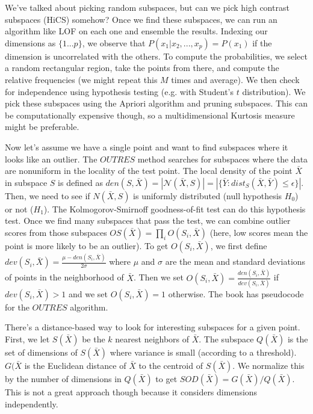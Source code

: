 \documentclass[a4paper]{article}
\begin{document}
We've talked about picking random subspaces, but can we pick high contrast
subspaces (HiCS) somehow? Once we find these subspaces, we can run an algorithm
like LOF on each one and ensemble the results. Indexing our dimensions as
$\{1...p\}$, we observe that $P(x_1 | x_2, ..., x_p) = P(x_1)$ if the dimension
is uncorrelated with the others. To compute the probabilities, we select a
random rectangular region, take the points from there, and compute the
relative frequencies (we might repeat this $M$ times and average). We then check
for independence using hypothesis testing (e.g. with Student's $t$
distribution). We pick these subspaces using the Apriori algorithm and pruning
subspaces. This can be computationally expensive though, so a multidimensional
Kurtosis measure might be preferable.

Now let's assume we have a single point and want to find subspaces where it
looks like an outlier. The $OUTRES$ method searches for subspaces where the
data are nonuniform in the locality of the test point. The local density of the
point $\bar{X}$ in subspace $S$ is defined as $den(S, \bar{X}) = |\mathcal{N}(
\bar{X}, S)| = |\{\bar{Y} : dist_S(\bar{X}, \bar{Y}) \leq \epsilon\}|$. Then,
we need to see if $N(\bar{X}, S)$ is uniformly distributed (null hypothesis
$H_0$) or not ($H_1$). The Kolmogorov-Smirnoff goodness-of-fit test can do
this hypothesis test. Once we find many subspaces that pass the test, we can
combine outlier scores from those subspaces $OS(\bar{X}) = \prod_{i}{O(S_i,
\bar{X})}$ (here, low scores mean the point is more likely to be an outlier).
To get $O(S_i, \bar{X})$, we first define $dev(S_i, \bar{X}) = \frac{\mu -
den(S_i, \bar{X})}{2 \sigma}$ where $\mu$ and $\sigma$ are the mean and standard
deviations of points in the neighborhood of $\bar{X}$. Then we set
$O(S_i, \bar{X}) = \frac{den(S_i, \bar{X})}{dev(S_i, \bar{X})}$ if $dev(S_i,
\bar{X}) > 1$ and we set $O(S_i, \bar{X}) = 1$ otherwise. The book has
pseudocode for the $OUTRES$ algorithm.

There's a distance-based way to look for interesting subspaces for a given
point. First, we let $S(\bar{X})$ be the $k$ nearest neighbors of $\bar{X}$.
The subspace $Q(\bar{X})$ is the set of dimensions of $S(\bar{X})$ where
variance is small (according to a threshold). $G(\bar{X}$ is the Euclidean
distance of $\bar{X}$ to the centroid of $S(\bar{X})$. We normalize this by
the number of dimensions in $Q(\bar{X})$ to get $SOD(\bar{X}) = G(\bar{X})/
Q(\bar{X})$. This is not a great approach though because it considers dimensions
independently.
\end{document}
